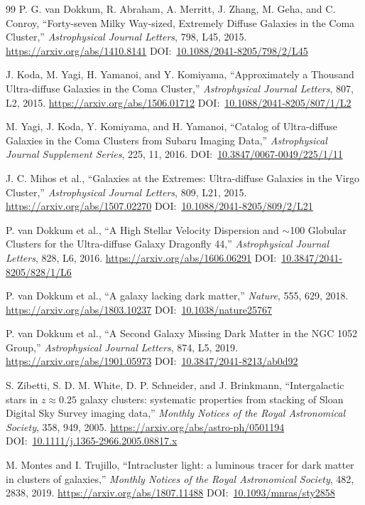 \documentclass[10pt,onecolumn]{article}
\newcommand{\doi}[1]{DOI:~\href{https://doi.org/#1}{#1}}
\begin{document}
\begin{thebibliography}{99}
P. G. van Dokkum, R. Abraham, A. Merritt, J. Zhang, M. Geha, and C. Conroy,
``Forty-seven Milky Way-sized, Extremely Diffuse Galaxies in the Coma Cluster,''
\emph{Astrophysical Journal Letters}, 798, L45, 2015.
\url{https://arxiv.org/abs/1410.8141}
\doi{10.1088/2041-8205/798/2/L45}

J. Koda, M. Yagi, H. Yamanoi, and Y. Komiyama,
``Approximately a Thousand Ultra-diffuse Galaxies in the Coma Cluster,''
\emph{Astrophysical Journal Letters}, 807, L2, 2015.
\url{https://arxiv.org/abs/1506.01712}
\doi{10.1088/2041-8205/807/1/L2}

M. Yagi, J. Koda, Y. Komiyama, and H. Yamanoi,
``Catalog of Ultra-diffuse Galaxies in the Coma Clusters from Subaru Imaging Data,''
\emph{Astrophysical Journal Supplement Series}, 225, 11, 2016.
\doi{10.3847/0067-0049/225/1/11}

J. C. Mihos et al.,
``Galaxies at the Extremes: Ultra-diffuse Galaxies in the Virgo Cluster,''
\emph{Astrophysical Journal Letters}, 809, L21, 2015.
\url{https://arxiv.org/abs/1507.02270}
\doi{10.1088/2041-8205/809/2/L21}

P. van Dokkum et al.,
``A High Stellar Velocity Dispersion and $\sim$100 Globular Clusters for the Ultra-diffuse Galaxy Dragonfly 44,''
\emph{Astrophysical Journal Letters}, 828, L6, 2016.
\url{https://arxiv.org/abs/1606.06291}
\doi{10.3847/2041-8205/828/1/L6}

P. van Dokkum et al.,
``A galaxy lacking dark matter,''
\emph{Nature}, 555, 629, 2018.
\url{https://arxiv.org/abs/1803.10237}
\doi{10.1038/nature25767}

P. van Dokkum et al.,
``A Second Galaxy Missing Dark Matter in the NGC 1052 Group,''
\emph{Astrophysical Journal Letters}, 874, L5, 2019.
\url{https://arxiv.org/abs/1901.05973}
\doi{10.3847/2041-8213/ab0d92}

S. Zibetti, S. D. M. White, D. P. Schneider, and J. Brinkmann,
``Intergalactic stars in $z\approx0.25$ galaxy clusters: systematic properties from stacking of Sloan Digital Sky Survey imaging data,''
\emph{Monthly Notices of the Royal Astronomical Society}, 358, 949, 2005.
\url{https://arxiv.org/abs/astro-ph/0501194}
\doi{10.1111/j.1365-2966.2005.08817.x}

M. Montes and I. Trujillo,
``Intracluster light: a luminous tracer for dark matter in clusters of galaxies,''
\emph{Monthly Notices of the Royal Astronomical Society}, 482, 2838, 2019.
\url{https://arxiv.org/abs/1807.11488}
\doi{10.1093/mnras/sty2858}


\end{thebibliography}
\end{document}
